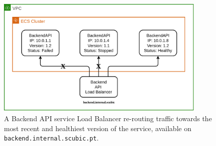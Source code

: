 \begin{figure}[!htbp]
    \centering
    \includegraphics[width=0.90\textwidth]{img/diagrams/pdf/load-balancing.drawio.pdf}
    \caption[Load Balancing Example]{A Backend API service Load Balancer re-routing traffic towards the most recent and healthiest version of the service, available on \texttt{backend.internal.scubic.pt}.}
    \label{fig:load-balancing}
\end{figure}
